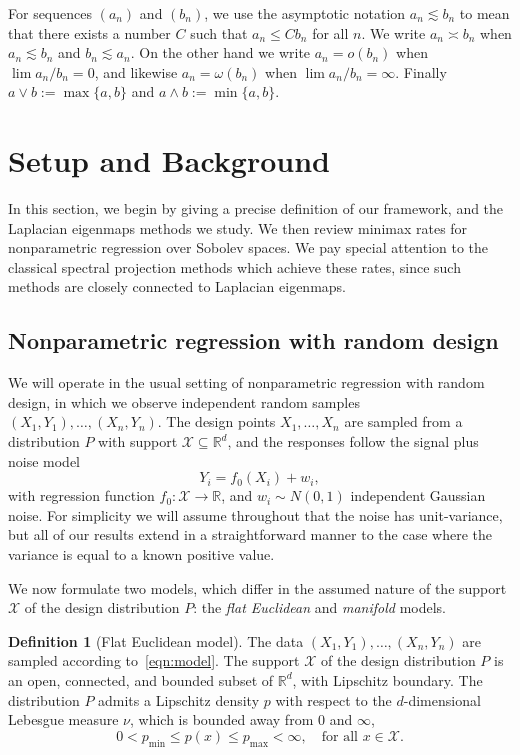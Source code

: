 \documentclass{article}
\newcommand{\Reals}{\mathbb{R}}
\newcommand{\1}{\mathbf{1}}
\newcommand{\Rd}{\Reals^d}
\newcommand{\mc}[1]{\mathcal{#1}}
\theoremstyle{alden}
\theoremstyle{aldenthm}
\theoremstyle{definition}
\newtheorem{definition}{Definition}[section]
\theoremstyle{remark}
\begin{document}
For sequences $(a_n)$ and $(b_n)$, we use the asymptotic notation $a_n \lesssim b_n$ to mean that there exists a number $C$ such that $a_n \leq C b_n$ for all $n$. We write $a_n \asymp b_n$ when $a_n \lesssim b_n$ and $b_n \lesssim a_n$. On the other hand we write $a_n = o(b_n)$ when $\lim a_n/b_n = 0$, and likewise $a_n = \omega(b_n)$ when $\lim a_n/b_n = \infty$. Finally $a \vee b := \max\{a,b\}$ and $a \wedge b := \min\{a,b\}$.

\section{Setup and Background}
\label{sec:setup_main_results}

In this section, we begin by giving a precise definition of our framework, and the Laplacian eigenmaps methods we study. We then review minimax rates for nonparametric regression over Sobolev spaces. We pay special attention to the classical spectral projection methods which achieve these rates, since such methods are closely connected to Laplacian eigenmaps.

\subsection{Nonparametric regression with random design}
\label{sec:regression_laplacian_eigenmaps}

We will operate in the usual setting of nonparametric regression with random design, in which we observe independent random samples $(X_1,Y_1),\ldots,(X_n,Y_n)$. The design points $X_1,\ldots,X_n$ are sampled from a distribution $P$ with support $\mc{X} \subseteq \Rd$, and the responses follow the signal plus noise model
\begin{equation}
\label{eqn:model}
Y_i = f_0(X_i) + w_i,
\end{equation}
with regression function $f_0: \mc{X} \to \Reals$, and $w_i \sim N(0,1)$ independent Gaussian noise. For simplicity we will assume throughout that the noise has unit-variance, but all of our results extend in a straightforward manner to the case where the variance is equal to a known positive value. 

We now formulate two models, which differ in the assumed nature of the support $\mc{X}$ of the design distribution $P$: the \emph{flat Euclidean} and \emph{manifold} models.

\begin{definition}[Flat Euclidean model]
	\label{def:model_flat_euclidean}
	The data $(X_1,Y_1),\ldots,(X_n,Y_n)$ are sampled according to~\eqref{eqn:model}. The support $\mc{X}$ of the design distribution $P$ is an open, connected, and bounded subset of $\Rd$, with Lipschitz boundary. The distribution $P$ admits a Lipschitz density $p$ with respect to the $d$-dimensional Lebesgue measure $\nu$, which is bounded away from $0$ and $\infty$,
	\begin{equation*}
	0 < p_{\min} \leq p(x) \leq p_{\max} < \infty, \quad \textrm{for all $x \in \mc{X}$.}
	\end{equation*}
\end{definition}
\end{document}
